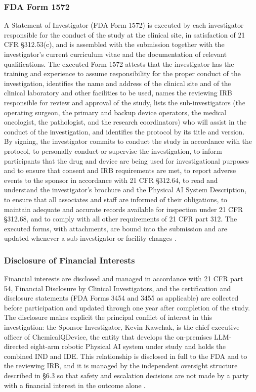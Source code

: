 \subsubsection{FDA Form 1572}

A Statement of Investigator (FDA Form 1572) is executed by each investigator
responsible for the conduct of the study at the clinical site, in satisfaction of
21 CFR \S 312.53(c), and is assembled with the submission together with the
investigator's current curriculum vitae and the documentation of relevant
qualifications. The executed Form 1572 attests that the investigator has the
training and experience to assume responsibility for the proper conduct of the
investigation, identifies the name and address of the clinical site and of the
clinical laboratory and other facilities to be used, names the reviewing IRB
responsible for review and approval of the study, lists the sub-investigators (the
operating surgeon, the primary and backup device operators, the medical oncologist,
the pathologist, and the research coordinators) who will assist in the conduct of
the investigation, and identifies the protocol by its title and version. By signing,
the investigator commits to conduct the study in accordance with the protocol, to
personally conduct or supervise the investigation, to inform participants that the
drug and device are being used for investigational purposes and to ensure that
consent and IRB requirements are met, to report adverse events to the sponsor in
accordance with 21 CFR \S 312.64, to read and understand the investigator's brochure
and the Physical AI System Description, to ensure that all associates and staff are
informed of their obligations, to maintain adequate and accurate records available
for inspection under 21 CFR \S 312.68, and to comply with all other requirements of
21 CFR part 312. The executed forms, with attachments, are bound into the submission
and are updated whenever a sub-investigator or facility changes \cite{phase1guidance}.

\subsubsection{Disclosure of Financial Interests}

Financial interests are disclosed and managed in accordance with 21 CFR part 54,
Financial Disclosure by Clinical Investigators, and the certification and disclosure
statements (FDA Forms 3454 and 3455 as applicable) are collected before participation
and updated through one year after completion of the study. The disclosure makes
explicit the principal conflict of interest in this investigation: the
Sponsor-Investigator, Kevin Kawchak, is the chief executive officer of
ChemicalQDevice, the entity that develops the on-premises LLM-directed eight-arm
robotic Physical AI system under study and holds the combined IND and IDE. This
relationship is disclosed in full to the FDA and to the reviewing IRB, and it is
managed by the independent oversight structure described in \S 6.3 so that safety and
escalation decisions are not made by a party with a financial interest in the outcome
alone \cite{cfr312paiuni,clintrustpai}.

